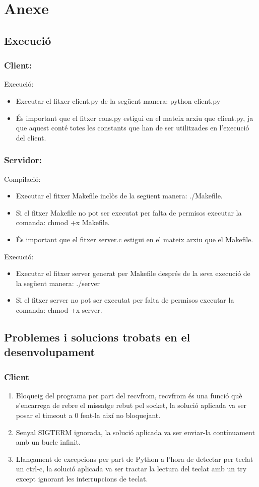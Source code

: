 \documentclass[11pt]{article}
\begin{document}
\section{Anexe}
	\subsection{Execució}
		\subsubsection*{Client:}
Execució:
\begin{itemize}
\item Executar el fitxer client.py de la següent manera: python client.py
\item És important que el fitxer cons.py estigui en el mateix arxiu que client.py, ja que aquest conté totes les constants que han de ser utilitzades en l'execució del client.
\end{itemize}
\subsubsection*{Servidor:}
Compilació:
\begin{itemize}
\item Executar el fitxer Makefile inclòs de la següent manera: ./Makefile.
\item Si el fitxer Makefile no pot ser executat per falta de permisos executar la comanda: chmod +x Makefile.
\item És important que el fitxer server.c estigui en el mateix arxiu que el Makefile.
\end{itemize}
Execució:
\begin{itemize}
\item Executar el fitxer server generat per Makefile després de la seva execució de la següent manera: ./server
\item Si el fitxer server no pot ser executat per falta de permisos executar la comanda: chmod +x server.
\end{itemize}
\subsection{Problemes i solucions trobats en el desenvolupament}
\subsubsection*{Client}
\begin{enumerate}
\item Bloqueig del programa per part del recvfrom, recvfrom és una funció què s'encarrega de rebre el missatge rebut pel socket, la solució aplicada va ser posar el timeout a 0 fent-la així no bloquejant.
\item Senyal SIGTERM ignorada, la solució aplicada va ser enviar-la contínuament amb un bucle infinit.
\item Llançament de excepcions per part de Python a l'hora de detectar per teclat un ctrl-c, la solució aplicada va ser tractar la lectura del teclat amb un try except ignorant les interrupcions de teclat.
\end{enumerate}
\end{document}
